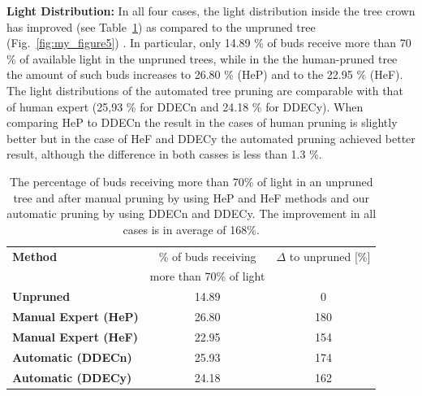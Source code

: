 \noindent\textbf{Light Distribution:} In all four cases, the light distribution inside the tree crown has
improved (see Table~\ref{tab:light}) as compared to the unpruned tree (Fig.~\ref{fig:my_figure5}) . 
In particular, only 14.89 \% of buds receive more than 70 \% of available light in the unpruned trees, 
while in the the human-pruned tree the amount of such buds increases to 26.80 \% (HeP) and to the 22.95 \% (HeF).
The light distributions of the automated tree pruning are comparable with
that of human expert (25,93 \% for DDECn and 24.18 \% for DDECy). 
When comparing HeP to DDECn the result in the cases of human pruning is slightly better but in the case of HeF and DDECy the automated pruning achieved better result, although the difference in both casses is less than 1.3 \%.  
\begin{table}[hbt]
\begin{center}
\begin{tabular}{ |l|c|c| } 
 \hline
 \textbf{Method} & \% of buds receiving                           & $\Delta$ to unpruned [\%] \\ 
                 &  more than 70\% of light                       &  \\ 
 \hline
 \textbf{Unpruned}            & 14.89 & 0 \\ 
 \hline
 \textbf{Manual Expert (HeP)} & 26.80 & 180 \\ 
 \textbf{Manual Expert (HeF)} & 22.95 & 154 \\ 
  \hline
 \textbf{Automatic (DDECn)} & 25.93 & 174 \\ 
 \textbf{Automatic (DDECy)} & 24.18 & 162 \\ 
 \hline
\end{tabular}
\end{center}
\caption{The percentage of buds receiving more than 70\% of light in an unpruned tree and after manual pruning by using HeP and HeF methods and our automatic pruning by using DDECn and DDECy. The improvement in all cases is in average of 168\%. }
\label{tab:light}
\end{table}

